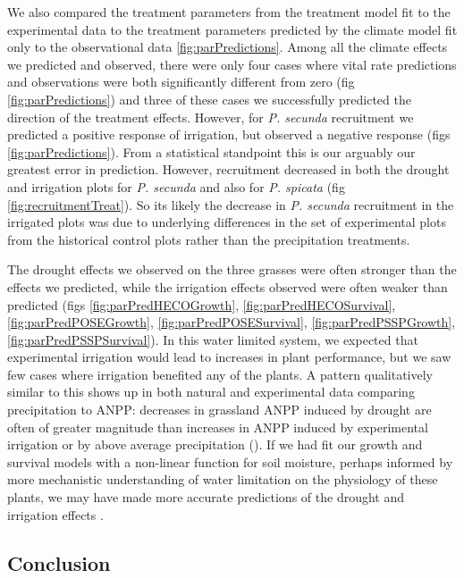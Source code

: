 \documentclass[11pt]{article}
\begin{document}
\begin{doublespacing}
We also compared the treatment parameters from the treatment model fit to the experimental data to the treatment parameters predicted by the climate model fit only to the observational data \ref{fig:parPredictions}. Among all the climate effects we predicted and observed, there were only four cases where vital rate predictions and observations were both significantly different from zero (fig \ref{fig:parPredictions}) and three of these cases we successfully predicted the direction of the treatment effects. However, for \textit{P. secunda} recruitment we predicted a positive response of irrigation, but observed a negative response (figs \ref{fig:parPredictions}). From a statistical standpoint this is our arguably our greatest error in prediction. However, recruitment decreased in both the drought and irrigation plots for \textit{P. secunda} and also for \textit{P. spicata} (fig \ref{fig:recruitmentTreat}). So its likely the decrease in \textit{P. secunda} recruitment in the irrigated plots was due to underlying differences in the set of experimental plots from the historical control plots rather than the precipitation treatments.  

The drought effects we observed on the three grasses were often stronger than the effects we predicted, while the irrigation effects observed were often weaker than predicted (figs \ref{fig:parPredHECOGrowth}, \ref{fig:parPredHECOSurvival}, \ref{fig:parPredPOSEGrowth}, \ref{fig:parPredPOSESurvival}, \ref{fig:parPredPSSPGrowth}, \ref{fig:parPredPSSPSurvival}). In this water limited system, we expected that experimental irrigation would lead to increases in plant performance, but we saw few cases where irrigation benefited any of the plants. A pattern qualitatively similar to this shows up in both natural and experimental data comparing precipitation to ANPP: decreases in grassland ANPP induced by drought are often of greater magnitude than increases in ANPP induced by experimental irrigation or by above average precipitation (\citep{hsu_anticipating_2014,gherardi_enhanced_2015}). If we had fit our growth and survival models with a non-linear function for soil moisture, perhaps informed by more mechanistic understanding of water limitation on the physiology of these plants, we may have made more accurate predictions of the drought and irrigation effects \citep{ehrlen_advancing_2016}.

\subsection*{Conclusion}


\end{doublespacing}
\end{document}
